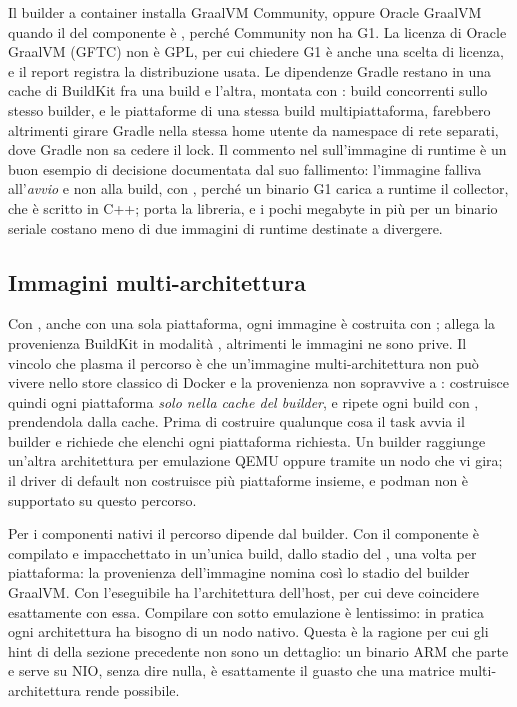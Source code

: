 Il builder a container installa GraalVM Community, oppure Oracle GraalVM quando
il  del componente \`e , perch\'e Community non ha G1. La
licenza di Oracle GraalVM (GFTC) non \`e GPL, per cui chiedere G1 \`e anche una
scelta di licenza, e il report registra la distribuzione usata. Le dipendenze
Gradle restano in una cache di BuildKit fra una build e l'altra, montata con
: build concorrenti sullo stesso builder, e le piattaforme
di una stessa build multipiattaforma, farebbero altrimenti girare Gradle nella
stessa home utente da namespace di rete separati, dove Gradle non sa cedere il
lock. Il commento nel  sull'immagine di runtime \`e un buon
esempio di decisione documentata dal suo fallimento: l'immagine 
falliva all'\emph{avvio} e non alla build, con
, perch\'e un binario G1
carica a runtime il collector, che \`e scritto in C++;  porta la
libreria, e i pochi megabyte in pi\`u per un binario seriale costano meno di due
immagini di runtime destinate a divergere.

\subsection{Immagini multi-architettura}

Con , anche con una sola piattaforma, ogni immagine
\`e costruita con ;
 allega la provenienza BuildKit in modalit\`a
, altrimenti le immagini ne sono prive. Il vincolo che plasma il
percorso \`e che un'immagine multi-architettura non pu\`o vivere nello store
classico di Docker e la provenienza non sopravvive a :
 costruisce quindi ogni piattaforma \emph{solo nella cache
del builder}, e  ripete ogni build con ,
prendendola dalla cache. Prima di costruire qualunque cosa il task
 avvia il builder e richiede che
 elenchi ogni piattaforma
richiesta. Un builder raggiunge un'altra architettura per emulazione QEMU oppure
tramite un nodo che vi gira; il driver  di default non costruisce
pi\`u piattaforme insieme, e podman non \`e supportato su questo percorso.

Per i componenti nativi il percorso dipende dal builder. Con
 il componente \`e compilato e impacchettato in
un'unica build, dallo stadio  del , una
volta per piattaforma: la provenienza dell'immagine nomina cos\`i lo stadio del
builder GraalVM. Con  l'eseguibile ha l'architettura
dell'host, per cui  deve coincidere esattamente con essa.
Compilare con  sotto emulazione \`e lentissimo: in pratica ogni
architettura ha bisogno di un nodo nativo. Questa \`e la ragione per cui gli
hint di  della sezione precedente non sono un dettaglio: un
binario ARM che parte e serve su NIO, senza dire nulla, \`e esattamente il
guasto che una matrice multi-architettura rende possibile.

